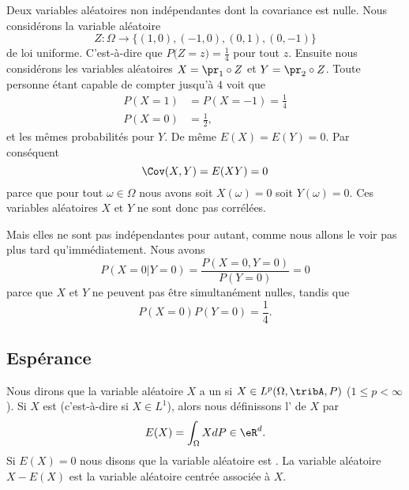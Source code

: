 \begin{example} \label{ExWLzkuWd}
    Deux variables aléatoires non indépendantes dont la covariance est nulle. Nous considérons la variable aléatoire
    \begin{equation}
        Z\colon \Omega\to \{ (1,0),(-1,0),(0,1),(0,-1) \}
    \end{equation}
    de loi uniforme. C'est-à-dire que \(  P\big( Z=z \big)=\frac{1}{ 4 }  \) pour tout \( z\). Ensuite nous considérons les variables aléatoires \( X=\pr_1\circ Z\) et \( Y=\pr_2\circ Z\). Toute personne étant capable de compter jusqu'à \( 4\) voit que
    \begin{subequations}
        \begin{align}
            P(X=1)&=P(X=-1)=\frac{1}{ 4 }\\
            P(X=0)&=\frac{ 1 }{2},
        \end{align}
    \end{subequations}
    et les mêmes probabilités pour \( Y\). De même \( E(X)=E(Y)=0\). Par conséquent
    \begin{equation}
        \Cov(X,Y)=E(XY)=0
    \end{equation}
    parce que pour tout \( \omega\in \Omega\) nous avons soit \( X(\omega)=0\) soit \( Y(\omega)=0\). Ces variables aléatoires \( X\) et \( Y\) ne sont donc pas corrélées.

    Mais elles ne sont pas indépendantes pour autant, comme nous allons le voir pas plus tard qu'immédiatement. Nous avons
    \begin{equation}
        P(X=0|Y=0)=\frac{ P(X=0,Y=0) }{ P(Y=0) }=0
    \end{equation}
    parce que \( X\) et \( Y\) ne peuvent pas être simultanément nulles, tandis que
    \begin{equation}
        P(X=0)P(Y=0)=\frac{1}{ 4 }.
    \end{equation}
\end{example}

\subsection{Espérance}

Nous dirons que la variable aléatoire \( X\) a un  si \( X\in L^p(\Omega,\tribA,P)\) (\( 1\leq p<\infty\)). Si \( X\) est  (c'est-à-dire si \( X\in L^1\)), alors nous définissons l' de \( X\) par
\begin{equation}        \label{EqdCBLst}
    E(X)=\int_{\Omega}XdP\in\eR^d.
\end{equation}
Si \( E(X)=0\) nous disons que la variable aléatoire est . La variable aléatoire \( X-E(X)\) est la variable aléatoire centrée associée à \( X\).

